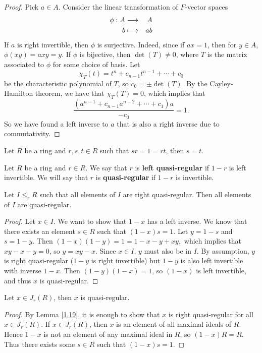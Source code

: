\begin{proof}
Pick $a \in A$. Consider the linear transformation of $F$-vector spaces
\begin{eqnarray*}
\phi: A &\longrightarrow & A \\
b &\longmapsto & ab
\end{eqnarray*}
If $a$ is right invertible, then $\phi$ is surjective. Indeed, since if $ax = 1$, then for $y \in A$, $\phi (xy) = axy = y$. If $\phi$ is bijective, then $\det (T) \neq 0$, where $T$ is the matrix associated to $\phi$ for some choice of basis. Let 
$$\chi_T(t) = t^n + c_{n-1}t^{n-1} + \cdots + c_0$$
be the characteristic polynomial of $T$, so $c_0 = \pm \det (T).$ By the Cayley-Hamilton theorem, we have that $\chi_T(T) = 0$, which implies that 
$$\frac{(a^{n-1} + c_{n-1}a^{n-2} + \cdots + c_1)a}{-c_0} = 1.$$
So we have found a left inverse to $a$ that is also a right inverse due to commutativity.
\end{proof}

\begin{lemma}\label{1.17}
Let $R$ be a ring and $r,s,t \in R$ such that $sr = 1 =rt$, then $s = t$.
\end{lemma}
\begin{defn}\label{1.18}
Let $R$ be a ring and $r \in R$. We say that $r$ is \textbf{left quasi-regular} if $1-r$ is left invertible. We will say that $r$ is \textbf{quasi-regular} if $1-r$ is invertible.
\end{defn}

\begin{lemma}\label{1.19}
Let $I\leq_r R$ such that all elements of $I$ are right quasi-regular. Then all elements of $I$ are quasi-regular.
\end{lemma}
\begin{proof}
Let $x \in I$. We want to show that $1-x$ has a left inverse. We know that there exists an element $s \in R$ such that $(1-x)s = 1$. Let $y = 1-s$ and $s=  1- y$. Then $(1-x)(1-y) = 1 = 1- x - y + xy,$ which implies that $xy - x -y = 0$, so $y = xy - x$. Since $x \in I$, $y$ must also be in $I$. By assumption, $y$ is right quasi-regular ($1-y$ is right invertible) but $1-y$ is also left invertible with inverse $1-x$. Then $(1-y)(1-x) = 1$, so $(1-x)$ is left invertible, and thus $x$ is quasi-regular.
\end{proof}

\begin{lemma}\label{1.20}
Let $x \in J_r(R)$, then $x$ is quasi-regular.
\end{lemma}
\begin{proof}
By Lemma \ref{1.19}, it is enough to show that $x$ is right quasi-regular for all $x \in J_r(R)$. If $x \in J_r(R)$, then $x$ is an element of all maximal ideals of $R$. Hence $1-x$ is not an element of any maximal ideal in $R$, so $(1-x)R = R$. Thus there exists some $s \in R$ such that $(1-x)s = 1$.
\end{proof}

